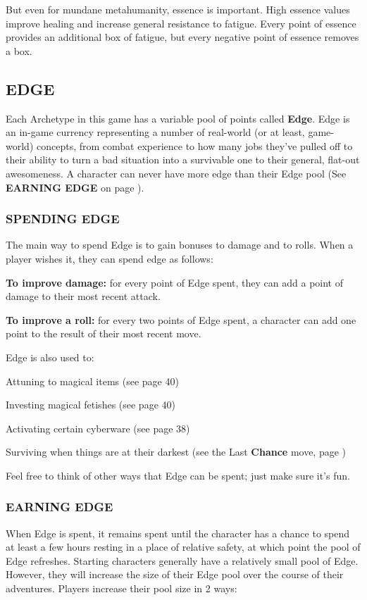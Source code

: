 \documentclass[oneside,10pt]{article}
\begin{document}
\begin{multicols}{2}
But even for mundane metahumanity, essence is important. High essence
values improve healing and increase general resistance to
fatigue. Every point of essence provides an additional box of fatigue,
but every negative point of essence removes a box. 

\subsection{EDGE}
\label{stat_edge}

Each Archetype in this game has a variable pool of points
called \textbf{Edge}. Edge is an in-game currency representing a
number of real-world (or at least, game-world) concepts,
from combat experience to how many jobs they’ve pulled off
 to their ability to turn a bad situation into a survivable one to
 their general, flat-out awesomeness. A character can never have more
 edge than their Edge pool (See \textbf{EARNING EDGE} on page \pageref{earningedge}).

 \subsubsection{SPENDING EDGE}
 \label{spendingedge}
The main way to spend Edge is to gain bonuses to damage
and to rolls. When a player wishes it, they can spend edge
as follows:

\begin{dent}
\textbf{To improve damage:} for every point of Edge spent, they
can add a point of damage to their most recent
attack.

\textbf{To improve a roll:} for every two points of Edge spent,
a character can add one point to the result of their most
recent move.
\end{dent}

Edge is also used to:

\begin{dent}
\tcirc{} Attuning to magical items (see page 40)

\tcirc{} Investing magical fetishes (see page 40)

\tcirc{} Activating certain cyberware (see page 38)

\tcirc{} Surviving when things are at their darkest (see the Last
\textbf{Chance} move, page \pageref{move_lastchance})
\end{dent}

Feel free to think of other ways that Edge can be spent; just
make sure it’s fun.

\subsubsection{EARNING EDGE}
\label{earningedge}
When Edge is spent, it remains spent until the character has a chance
to spend at least a few hours resting in a place of relative safety,
at which point the pool of Edge refreshes.  Starting characters
generally have a relatively small pool of Edge. However, they will
increase the size of their Edge pool over the course of their
adventures. Players increase their pool size in 2 ways:
\begin{dent}


\end{dent}
\end{multicols}
\end{document}

